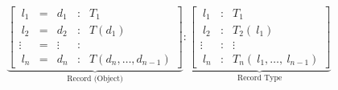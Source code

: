 \[
    \underbrace{\begin{bmatrix}
        \ l_{1} & = & d_{1} & : & T_{1}\\
        \ l_{2} & = & d_{2} & : & T( d_{1})\\
        \vdots  & = & \vdots  & : & \\
        \ l_{n} & = & d_{n} & : & T( d_{n} ,\dotsc ,d_{n-1})
    \end{bmatrix}}_{\text{Record (Object)}} :\underbrace{\begin{bmatrix}
        \ l_{1} & : & T_{1}\\
        \ l_{2} & : & T_{2}( \ l_{1})\\
    \vdots  & : & \vdots \\
    \ l_{n} & : & T_{n}( \ l_{1} ,\dotsc ,\ l_{n-1})
    \end{bmatrix}}_{\text{Record Type}}
\]